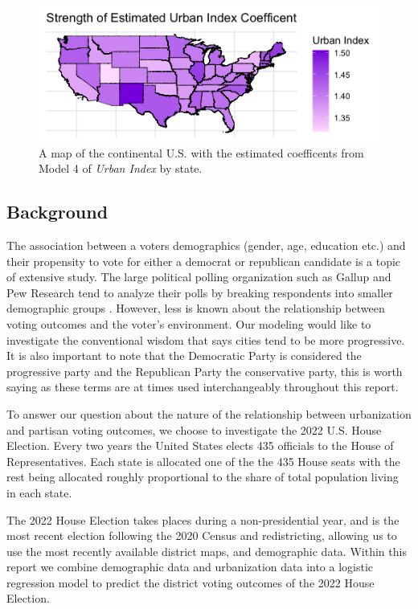 \documentclass[12pt]{article}
\begin{document}
\begin{figure}[!ht]
	\includegraphics[width=\linewidth]{figures/beginning_image.png}
	
	\caption{A map of the continental U.S. with the estimated coefficents from Model 4 of \textit{Urban Index} by state. }
	\label{map:urban_index_by_state}
\end{figure}

\subsection*{Background}
The association between a voters demographics (gender, age, education etc.) and their propensity to vote for either a democrat or republican candidate is a topic of extensive study. The large political polling organization such as Gallup and Pew Research tend to analyze their polls by breaking respondents into smaller demographic groups \parencite{pew2020}. However, less is known about the relationship between voting outcomes and the voter's environment. Our modeling would like to investigate the conventional wisdom that says cities tend to be more progressive.
It is also important to note that the Democratic Party is considered the progressive party and the Republican Party the conservative party, this is worth saying as these terms are at times used interchangeably throughout this report. 

To answer our question about the nature of the relationship between urbanization and partisan voting outcomes, we choose to investigate the 2022 U.S. House Election. Every two years the United States elects 435 officials to the House of Representatives. Each state is allocated one of the the 435 House seats with the rest being allocated roughly proportional to the share of total population living in each state. 

The 2022 House Election takes places during a non-presidential year, and is the most recent election following the 2020 Census and redistricting, allowing us to use the most recently available district maps, and demographic data. Within this report we combine demographic data and urbanization data into a logistic regression model to predict the district voting outcomes of the 2022 House Election. 
\end{document}
